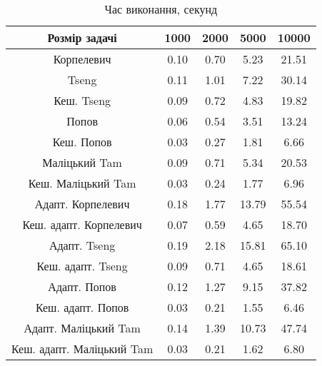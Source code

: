 \begin{table}[H]
	\centering
	\begin{tabular}{|c||c|c|c|c|}\hline
		Розмір задачі & 1000 & 2000 & 5000 & 10000 \\ \hline \hline
		Корпелевич & 0.10 & 0.70 & 5.23 & 21.51 \\ \hline
		Tseng & 0.11 & 1.01 & 7.22 & 30.14 \\ \hline
		Кеш. Tseng & 0.09 & 0.72 & 4.83 & 19.82 \\ \hline
		Попов & 0.06 & 0.54 & 3.51 & 13.24 \\ \hline
		Кеш. Попов & 0.03 & 0.27 & 1.81 & 6.66 \\ \hline
		Маліцький Tam & 0.09 & 0.71 & 5.34 & 20.53 \\ \hline
		Кеш. Маліцький Tam & 0.03 & 0.24 & 1.77 & 6.96 \\ \hline \hline
		Адапт. Корпелевич & 0.18 & 1.77 & 13.79 & 55.54 \\ \hline
		Кеш. адапт. Корпелевич & 0.07 & 0.59 & 4.65 & 18.70 \\ \hline
		Адапт. Tseng & 0.19 & 2.18 & 15.81 & 65.10 \\ \hline
		Кеш. адапт. Tseng & 0.09 & 0.71 & 4.65 & 18.61 \\ \hline
		Адапт. Попов & 0.12 & 1.27 & 9.15 & 37.82 \\ \hline
		Кеш. адапт. Попов & 0.03 & 0.21 & 1.55 & 6.46 \\ \hline
		Адапт. Маліцький Tam & 0.14 & 1.39 & 10.73 & 47.74 \\ \hline
		Кеш. адапт. Маліцький Tam & 0.03 & 0.21 & 1.62 & 6.80 \\ \hline
	\end{tabular}
	\caption{Час виконання, секунд}
\end{table}
